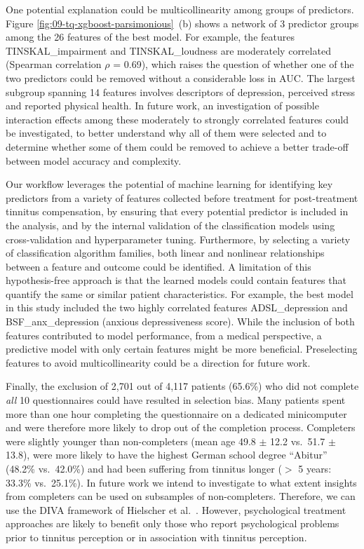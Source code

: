 \documentclass[
  oneside]{book}
\begin{document}
One potential explanation could be multicollinearity among groups of predictors.
Figure \ref{fig:09-tq-xgboost-parsimonious}~(b) shows a network of 3 predictor groups among the 26 features of the best model.
For example, the features TINSKAL\_impairment and TINSKAL\_loudness are moderately correlated (Spearman correlation \(\rho\) = 0.69), which raises the question of whether one of the two predictors could be removed without a considerable loss in AUC.
The largest subgroup spanning 14 features involves descriptors of depression, perceived stress and reported physical health.
In future work, an investigation of possible interaction effects among these moderately to strongly correlated features could be investigated, to better understand why all of them were selected and to determine whether some of them could be removed to achieve a better trade-off between model accuracy and complexity.

Our workflow leverages the potential of machine learning for identifying key predictors from a variety of features collected before treatment for post-treatment tinnitus compensation, by ensuring that every potential predictor is included in the analysis, and by the internal validation of the classification models using cross-validation and hyperparameter tuning.
Furthermore, by selecting a variety of classification algorithm families, both linear and nonlinear relationships between a feature and outcome could be identified.
A limitation of this hypothesis-free approach is that the learned models could contain features that quantify the same or similar patient characteristics.
For example, the best model in this study included the two highly correlated features ADSL\_depression and BSF\_anx\_depression (anxious depressiveness score).
While the inclusion of both features contributed to model performance, from a medical perspective, a predictive model with only certain features might be more beneficial. Preselecting features to avoid multicollinearity could be a direction for future work.

Finally, the exclusion of 2,701 out of 4,117 patients (65.6\%) who did not complete \emph{all} 10 questionnaires could have resulted in selection bias.
Many patients spent more than one hour completing the questionnaire on a dedicated minicomputer and were therefore more likely to drop out of the completion process.
Completers were slightly younger than non-completers (mean age 49.8 \(\pm\) 12.2 vs.~51.7 \(\pm\) 13.8), were more likely to have the highest German school degree ``Abitur'' (48.2\% vs.~42.0\%) and had been suffering from tinnitus longer (\(>\) 5 years: 33.3\% vs.~25.1\%).
In future work we intend to investigate to what extent insights from completers can be used on subsamples of non-completers.
Therefore, we can use the DIVA framework of Hielscher et al.~\autocite{Hielscher:DIVA2018}.
However, psychological treatment approaches are likely to benefit only those who report psychological problems prior to tinnitus perception or in association with tinnitus perception.
\end{document}
